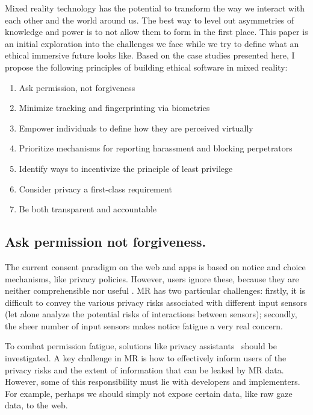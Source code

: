 Mixed reality technology has the potential to transform the way we interact with each other and the world around us. The best way to level out asymmetries of knowledge and power is to not allow them to form in the first place. This paper is an initial exploration into the challenges we face while we try to define what an ethical immersive future looks like. Based on the case studies presented here, I propose the following principles of building ethical software in mixed reality:

\begin{enumerate}
	\item Ask permission, not forgiveness
	\item Minimize tracking and fingerprinting via biometrics
	\item Empower individuals to define how they are perceived virtually
	\item Prioritize mechanisms for reporting harassment and blocking perpetrators
	\item Identify ways to incentivize the principle of least privilege
	\item Consider privacy a first-class requirement
	\item Be both transparent and accountable
\end{enumerate}

\subsection{Ask permission not forgiveness.} 
The current consent paradigm on the web and apps is based on notice and choice mechanisms, like privacy policies. However, users ignore these, because they are neither comprehensible nor useful \cite{schaub}. MR has two particular challenges: firstly, it is difficult to convey the various privacy risks associated with different input sensors (let alone analyze the potential risks of interactions between sensors); secondly, the sheer number of input sensors makes notice fatigue a very real concern.

To combat permission fatigue, solutions like privacy assistants~\cite{liu2016follow} should be investigated. A key challenge in MR is how to effectively inform users of the privacy risks and the extent of information that can be leaked by MR data. However, some of this responsibility must lie with developers and implementers. For example, perhaps we should simply not expose certain data, like raw gaze data, to the web.

